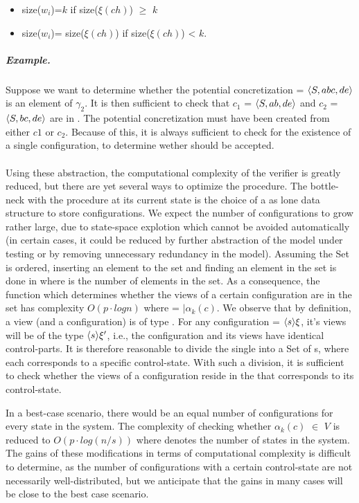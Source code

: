 \begin{itemize}
\item
size($w_i$)=$k$ if size($\xi(ch)$) $\geq$ $k$
\item
size($w_i$)= size($\xi(ch)$) if size($\xi(ch)$) < $k$.
\end{itemize}

\subparagraph{Example.} Suppose we want to determine whether the potential concretization  = $\langle S, abc, de\rangle$ is an element of $\gamma_2$. It is then sufficient to check that $c_1$ = $\langle S,ab,de\rangle$ and $c_2$ = $\langle S,bc ,de\rangle$ are in . The potential concretization must have been created from either $c1$ or $c_2$. Because of this, it is always sufficient to check for the existence of a single configuration, to determine wether  should be accepted.
\\\\

Using these abstraction, the computational complexity of the verifier is greatly reduced, but there are yet several ways to optimize the procedure. The bottle-neck with the procedure at its current state is the choice of a  as lone data structure to store configurations. We expect the number of configurations to grow rather large, due to state-space explotion which cannot be avoided automatically (in certain cases, it could be reduced by further abstraction of the model under testing or by removing unnecessary redundancy in the model). Assuming the Set is ordered, inserting an element to the set and finding an element in the set is done in  where  is the number of elements in the set. As a consequence, the function  which determines whether the views of a certain configuration are in the set has complexity $O(p \cdot log n)$ where  = $|\alpha_k(c)$. We observe that by definition, a view (and a configuration) is of type . For any configuration  = $\langle s\rangle{\xi}$, it's views will be of the type $\langle s\rangle{\xi'}$, i.e., the configuration and its views have identical control-parts. It is therefore reasonable to divide the single  into a Set of s, where each  corresponds to a specific control-state. With such a division, it is sufficient to check whether the views of a configuration reside in the  that corresponds to its control-state.

In a best-case scenario, there would be an equal number of configurations for every state in the system. The complexity of checking whether $\alpha_k(c)$ $\in$ $V$ is reduced to $O(p \cdot log (n/s))$ where  denotes the number of states in the system. The gains of these modifications in terms of computational complexity is difficult to determine, as the number of configurations with a certain control-state are not necessarily well-distributed, but we anticipate that the gains in many cases will be close to the best case scenario.

